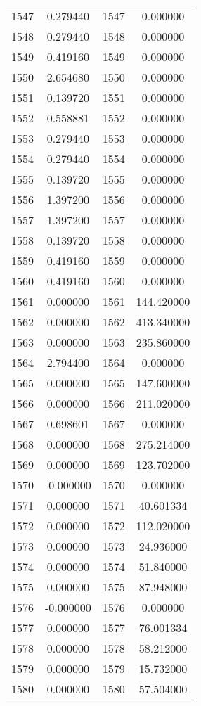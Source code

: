 \documentclass[12pt]{article}
\begin{document}
\begin{longtable}{@{}cccc@{}}
1547 & 0.279440 & 1547 & 0.000000 \\
1548 & 0.279440 & 1548 & 0.000000 \\
1549 & 0.419160 & 1549 & 0.000000 \\
1550 & 2.654680 & 1550 & 0.000000 \\
1551 & 0.139720 & 1551 & 0.000000 \\
1552 & 0.558881 & 1552 & 0.000000 \\
1553 & 0.279440 & 1553 & 0.000000 \\
1554 & 0.279440 & 1554 & 0.000000 \\
1555 & 0.139720 & 1555 & 0.000000 \\
1556 & 1.397200 & 1556 & 0.000000 \\
1557 & 1.397200 & 1557 & 0.000000 \\
1558 & 0.139720 & 1558 & 0.000000 \\
1559 & 0.419160 & 1559 & 0.000000 \\
1560 & 0.419160 & 1560 & 0.000000 \\
1561 & 0.000000 & 1561 & 144.420000 \\
1562 & 0.000000 & 1562 & 413.340000 \\
1563 & 0.000000 & 1563 & 235.860000 \\
1564 & 2.794400 & 1564 & 0.000000 \\
1565 & 0.000000 & 1565 & 147.600000 \\
1566 & 0.000000 & 1566 & 211.020000 \\
1567 & 0.698601 & 1567 & 0.000000 \\
1568 & 0.000000 & 1568 & 275.214000 \\
1569 & 0.000000 & 1569 & 123.702000 \\
1570 & -0.000000 & 1570 & 0.000000 \\
1571 & 0.000000 & 1571 & 40.601334 \\
1572 & 0.000000 & 1572 & 112.020000 \\
1573 & 0.000000 & 1573 & 24.936000 \\
1574 & 0.000000 & 1574 & 51.840000 \\
1575 & 0.000000 & 1575 & 87.948000 \\
1576 & -0.000000 & 1576 & 0.000000 \\
1577 & 0.000000 & 1577 & 76.001334 \\
1578 & 0.000000 & 1578 & 58.212000 \\
1579 & 0.000000 & 1579 & 15.732000 \\
1580 & 0.000000 & 1580 & 57.504000 \\

\end{longtable}
\end{document}
